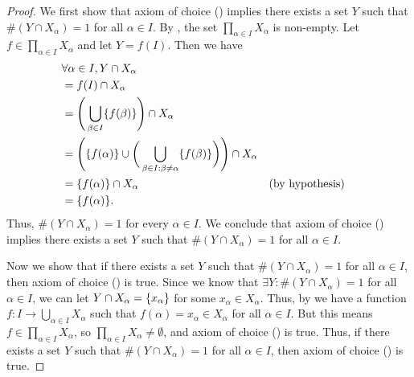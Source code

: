 \begin{proof}
  We first show that axiom of choice () implies there exists a set \(Y\) such that \(\#(Y \cap X_{\alpha}) = 1\) for all \(\alpha \in I\).
  By , the set \(\prod_{\alpha \in I} X_{\alpha}\) is non-empty.
  Let \(f \in \prod_{\alpha \in I} X_{\alpha}\) and let \(Y = f(I)\).
  Then we have
  \begin{align*}
     & \forall \alpha \in I, Y \cap X_{\alpha}                                                                                                             \\
     & = f(I) \cap X_{\alpha}                                                                                                                              \\
     & = \Bigg(\bigcup_{\beta \in I} \set{f(\beta)}\Bigg) \cap X_{\alpha}                                                                                  \\
     & = \Bigg(\set{f(\alpha)} \cup \bigg(\bigcup_{\beta \in I : \beta \neq \alpha} \set{f(\beta)}\bigg)\Bigg) \cap X_{\alpha}                             \\
     & = \set{f(\alpha)} \cap X_{\alpha}                                                                                       &  & \text{(by hypothesis)} \\
     & = \set{f(\alpha)}.
  \end{align*}
  Thus, \(\#(Y \cap X_{\alpha}) = 1\) for every \(\alpha \in I\).
  We conclude that axiom of choice () implies there exists a set \(Y\) such that \(\#(Y \cap X_{\alpha}) = 1\) for all \(\alpha \in I\).

  Now we show that if there exists a set \(Y\) such that \(\#(Y \cap X_{\alpha}) = 1\) for all \(\alpha \in I\), then axiom of choice () is true.
  Since we know that \(\exists Y : \#(Y \cap X_{\alpha}) = 1\) for all \(\alpha \in I\), we can let \(Y \cap X_{\alpha} = \left\lbrace x_{\alpha}\right\rbrace\) for some \(x_{\alpha} \in X_{\alpha}\).
  Thus, by  we have a function \(f : I \to \bigcup_{\alpha \in I} X_{\alpha}\) such that \(f(\alpha) = x_{\alpha} \in X_{\alpha}\) for all \(\alpha \in I\).
  But this means \(f \in \prod_{\alpha \in I} X_{\alpha}\), so \(\prod_{\alpha \in I} X_{\alpha} \neq \emptyset\), and axiom of choice () is true.
  Thus, if there exists a set \(Y\) such that \(\#(Y \cap X_{\alpha}) = 1\) for all \(\alpha \in I\), then axiom of choice () is true.
\end{proof}

